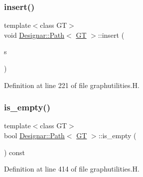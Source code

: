 \subsubsection{\texorpdfstring{insert()}{insert()}\hspace{0.1cm}{\footnotesize\ttfamily [2/2]}}
{\footnotesize\ttfamily template$<$class GT$>$ \\
void \hyperlink{class_designar_1_1_path}{Designar\+::\+Path}$<$ \hyperlink{demo-buildgraph_8_c_a3001c40d2c31ca87ed96cd7d1334a55e}{GT} $>$\+::insert (\begin{DoxyParamCaption}\item[{\hyperlink{class_designar_1_1_path_a7b499fd50e96e3360968d4cfef7a3736}{Node\+Type} \&}]{s }\end{DoxyParamCaption})\hspace{0.3cm}{\ttfamily [inline]}}



Definition at line 221 of file graphutilities.\+H.

\mbox{\label{class_designar_1_1_path_a80167d17fbc206944b05293253c95df0}} 
\subsubsection{\texorpdfstring{is\+\_\+empty()}{is\_empty()}}
{\footnotesize\ttfamily template$<$class GT$>$ \\
bool \hyperlink{class_designar_1_1_path}{Designar\+::\+Path}$<$ \hyperlink{demo-buildgraph_8_c_a3001c40d2c31ca87ed96cd7d1334a55e}{GT} $>$\+::is\+\_\+empty (\begin{DoxyParamCaption}{ }\end{DoxyParamCaption}) const\hspace{0.3cm}{\ttfamily [inline]}}



Definition at line 414 of file graphutilities.\+H.

\mbox{\label{class_designar_1_1_path_a9b358572a872b993a4cdad651cc2bf58}} 
